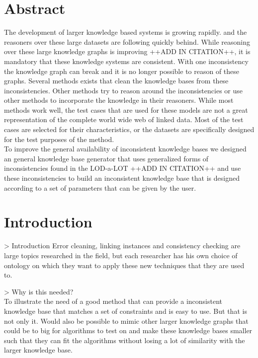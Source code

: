 \documentclass{article}
\begin{document}
\section*{Abstract}
The development of larger knowledge based systems is growing rapidly. and the reasoners over these large datasets are following quickly behind. While reasoning over these large knowledge graphs is improving ++ADD IN CITATION++, it is mandatory that these knowledge systems are consistent. With one inconsistency the knowledge graph can break and it is no longer possible to reason of these graphs. Several methods exists that clean the knowledge bases from these inconsistencies. Other methods try to reason around the inconsistencies or use other methods to incorporate the knowledge in their reasoners. While most methods work well, the test cases that are used for these models are not a great representation of the complete world wide web of linked data. Most of the test cases are selected for their characteristics, or the datasets are specifically designed for the test purposes of the method.\\
To improve the general availability of inconsistent knowledge bases we designed an general knowledge base generator that uses generalized forms of inconsistencies found in the LOD-a-LOT ++ADD IN CITATION++ and use these inconsistencies to build an inconsistent knowledge base that is designed according to a set of parameters that can be given by the user.\\


\newpage
\tableofcontents
\newpage
{}

\section{Introduction}
> Introduction
Error cleaning, linking instances and consistency checking are large topics researched in the field, but each researcher has his own choice of ontology on which they want to apply these new techniques that they are used to. 

> Why is this needed?\\
To illustrate the need of a good method that can provide a inconsistent knowledge base that matches a set of constraints and is easy to use. But that is not only it. Would also be possible to mimic other larger knowledge graphs that could be to big for algorithms to test on and make these knowledge bases smaller such that they can fit the algorithms without losing a lot of similarity with the larger knowledge base. \\
\end{document}
